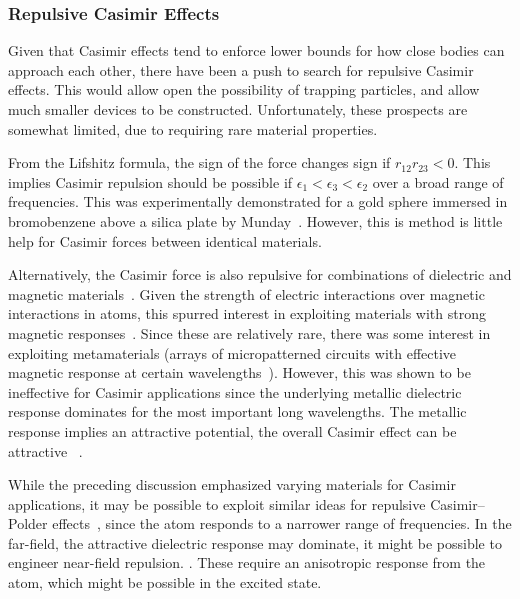 

\subsubsection{Repulsive Casimir Effects}

Given that Casimir effects tend to enforce lower bounds for how close bodies can approach each other,
there have been a push to search for repulsive Casimir effects.  This would allow open the possibility
of trapping particles, and allow much smaller devices to be constructed.  
Unfortunately, these prospects are somewhat limited, due to requiring rare material properties.

From the Lifshitz formula, the sign of the force changes sign if $r_{12}r_{23}<0$.
This implies Casimir repulsion should be possible if $\epsilon_1<\epsilon_3<\epsilon_2$ over a broad range of frequencies.
This was experimentally demonstrated for a gold sphere immersed in bromobenzene above a silica plate
by Munday~\etal\cite{Munday2009}.  However, this is method is little help for Casimir forces between
identical materials.  

Alternatively, the Casimir force is also repulsive for combinations of dielectric and magnetic materials~\cite{Boyer1974}.  
Given the strength of electric interactions over magnetic interactions in atoms, this spurred interest
in exploiting materials with strong magnetic responses~\cite{Kenneth2002}.  
Since these are relatively rare, there was some interest in exploiting metamaterials (arrays of micropatterned circuits with
effective magnetic response at certain wavelengths~\cite{Pendry1999}).  However, this was shown to be ineffective
for Casimir applications since the underlying metallic dielectric response dominates for the most important long wavelengths.
The metallic response implies an attractive potential, the overall Casimir effect can be attractive~
\cite{Ianuzzi2003comment,Rosa2008,Pirozhenko2008,Yannopapas2009}.  

While the preceding discussion emphasized varying materials for Casimir applications, it may 
be possible to exploit similar ideas for repulsive Casimir--Polder effects~\cite{Milton2011,Milton2012},
since the atom responds to a narrower range of frequencies.  In the far-field, the attractive dielectric
response may dominate, it might be possible to engineer near-field repulsion.  .
These require an anisotropic response from the atom, which might be possible in the excited state.

